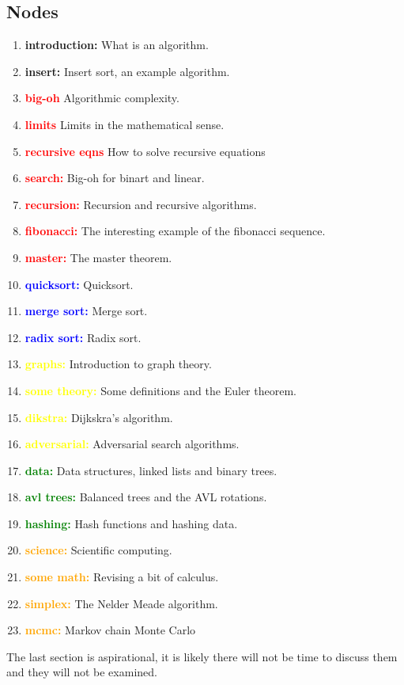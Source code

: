 \documentclass[11pt,a4paper]{scrartcl}
\begin{document}
\subsection*{Nodes}

\begin{enumerate}[label=(\alph*)]
\item \textbf{introduction:} What is an algorithm.
\item \textbf{insert:} Insert sort, an example algorithm.
\item \textbf{\textcolor{red}{big-oh}} Algorithmic complexity.
\item \textbf{\textcolor{red}{limits}} Limits in the mathematical sense.
\item \textbf{\textcolor{red}{recursive eqns}} How to solve recursive equations
\item \textbf{\textcolor{red}{search:}} Big-oh for binart and linear.
\item \textbf{\textcolor{red}{recursion:}} Recursion and recursive algorithms.
\item \textbf{\textcolor{red}{fibonacci:}} The interesting example of the fibonacci sequence. 
\item \textbf{\textcolor{red}{master:}} The master theorem.
\item \textbf{\textcolor{blue}{quicksort:}} Quicksort.
\item \textbf{\textcolor{blue}{merge sort:}} Merge sort.
\item \textbf{\textcolor{blue}{radix sort:}} Radix sort.
\item \textbf{\textcolor{yellow}{graphs:}} Introduction to graph theory.
\item \textbf{\textcolor{yellow}{some theory:}} Some definitions and the Euler theorem. 
\item \textbf{\textcolor{yellow}{dikstra:}} Dijkskra's algorithm.
\item \textbf{\textcolor{yellow}{adversarial:}} Adversarial search algorithms.
\item \textbf{\textcolor{green}{data:}} Data structures, linked lists and binary trees.
\item \textbf{\textcolor{green}{avl trees:}} Balanced trees and the AVL rotations. 
\item \textbf{\textcolor{green}{hashing:}} Hash functions and hashing data. 
\item \textbf{\textcolor{orange}{science:}} Scientific computing.
\item \textbf{\textcolor{orange}{some math:}} Revising a bit of calculus.
\item \textbf{\textcolor{orange}{simplex:}} The Nelder Meade algorithm.
\item \textbf{\textcolor{orange}{mcmc:}} Markov chain Monte Carlo

\end{enumerate}

The last section is aspirational, it is likely there will not be time to discuss them and they will not be examined.
\end{document}
